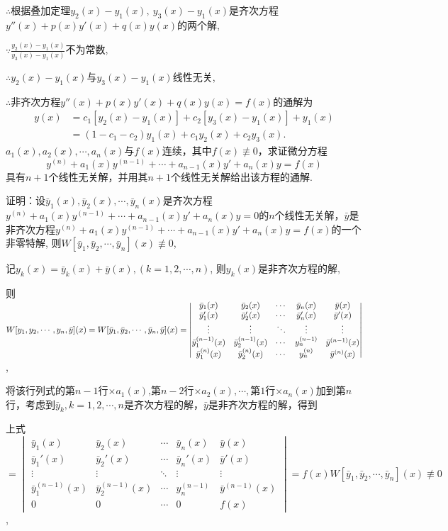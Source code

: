 \documentclass[12pt,UTF8]{ctexart}
\begin{document}
\begin{enumerate}
$\therefore$根据叠加定理$y_2(x)-y_1(x),\ y_3(x)-y_1(x)$是齐次方程$y''(x)+p(x)y'(x)+q(x)y(x)$的两个解, 

$\because\frac{y_2(x)-y_1(x)}{y_3(x)-y_1(x)}$不为常数,

$\therefore y_2(x)-y_1(x)$与$y_3(x)-y_1(x)$线性无关,

$\therefore$非齐次方程$y''(x)+p(x)y'(x)+q(x)y(x)=f(x)$的通解为
\[\begin{aligned}
y(x)&=c_1[y_2(x)-y_1(x)]+c_2[y_3(x)-y_1(x)]+y_1(x)\\
&=(1-c_1-c_2)y_1(x)+c_1y_2(x)+c_2y_3(x).
\end{aligned}\]
$a_1(x),a_2(x),\cdots,a_n(x)$与$f(x)$连续，其中$f(x)\not\equiv0$，求证微分方程
\[y^{(n)}+a_1(x)y^{(n-1)}+\cdots+a_{n-1}(x)y'+a_n(x)y=f(x)\]
具有$n+1$个线性无关解，并用其$n+1$个线性无关解给出该方程的通解.

证明：设$\bar{y}_1(x),\bar{y}_2(x),\cdots,\bar{y}_n(x)$是齐次方程$y^{(n)}+a_1(x)y^{(n-1)}+\cdots+a_{n-1}(x)y'+a_n(x)y=0$的$n$个线性无关解，$\bar{y}$是非齐次方程$y^{(n)}+a_1(x)y^{(n-1)}+\cdots+a_{n-1}(x)y'+a_n(x)y=f(x)$的一个非零特解, 则$W[\bar y_1,\bar y_2,\cdots,\bar y_n](x)\not\equiv0$,

记$y_k(x)=\bar{y}_k(x)+\bar y(x),(k=1,2,\cdots,n)$, 则$y_k(x)$是非齐次方程的解,

则$W[y_1,y_2,\cdots,y_n,\bar y](x)\\
=W[\bar y_1,\bar y_2,\cdots,\bar y_n,\bar y](x)\\
=\begin{vmatrix}
\bar y_1(x)&\bar y_2(x)&\cdots&\bar y_n(x)&\bar y(x)\\
\bar y_1'(x)&\bar y_2'(x)&\cdots&\bar y_n'(x)&\bar y'(x)\\
\vdots&\vdots&\ddots&\vdots&\vdots\\
\bar y_1^{(n-1)}(x)&\bar y_2^{(n-1)}(x)&\cdots&y_{n}^{(n-1)}&\bar y^{(n-1)}(x)\\
\bar y_1^{(n)}(x)&\bar y_2^{(n)}(x)&\cdots&y_{n}^{(n)}&\bar y^{(n)}(x)
\end{vmatrix}$,

将该行列式的第$n-1$行$\times a_1(x)$,第$n-2$行$\times a_2(x),\cdots,$第$1$行$\times a_n(x)$加到第$n$行，考虑到$\bar y_k,k=1,2,\cdots,n$是齐次方程的解，$\bar y$是非齐次方程的解，得到

上式$=\begin{vmatrix}
\bar y_1(x)&\bar y_2(x)&\cdots&\bar y_n(x)&\bar y(x)\\
\bar y_1'(x)&\bar y_2'(x)&\cdots&\bar y_n'(x)&\bar y'(x)\\
\vdots&\vdots&\ddots&\vdots&\vdots\\
\bar y_1^{(n-1)}(x)&\bar y_2^{(n-1)}(x)&\cdots&y_{n}^{(n-1)}&\bar y^{(n-1)}(x)\\
0&0&\cdots&0&f(x)
\end{vmatrix}=f(x)W[\bar y_1,\bar y_2,\cdots,\bar y_n](x)\not\equiv0$,


\end{enumerate}
\end{document}
